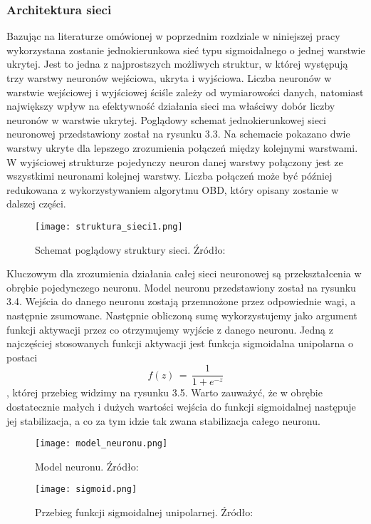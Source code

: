 \subsubsection{Architektura sieci}
Bazując na literaturze omówionej w poprzednim rozdziale w niniejszej pracy wykorzystana zostanie jednokierunkowa sieć typu sigmoidalnego o jednej warstwie ukrytej. Jest to jedna z najprostszych możliwych struktur, w której występują trzy warstwy neuronów wejściowa, ukryta i wyjściowa. Liczba neuronów w warstwie wejściowej i wyjściowej ściśle zależy od wymiarowości danych, natomiast największy wpływ na efektywność działania sieci ma właściwy dobór liczby neuronów w warstwie ukrytej. Poglądowy schemat jednokierunkowej sieci neuronowej przedstawiony został na rysunku 3.3. Na schemacie pokazano dwie warstwy ukryte dla lepszego zrozumienia połączeń między kolejnymi warstwami. W wyjściowej strukturze pojedynczy neuron danej warstwy połączony jest ze wszystkimi neuronami kolejnej warstwy. Liczba połączeń może być później redukowana z wykorzystywaniem algorytmu OBD, który opisany zostanie w dalszej części. 
\begin{figure}[!h]
    \label{fig:struktura-sieci}
    \centering \texttt{[image: struktura\_sieci1.png]}
    \caption{Schemat poglądowy struktury sieci. Źródło: }
\end{figure}

\par Kluczowym dla zrozumienia działania całej sieci neuronowej są przekształcenia w obrębie pojedynczego neuronu. Model neuronu przedstawiony został na rysunku 3.4. Wejścia do danego neuronu zostają przemnożone przez odpowiednie wagi, a następnie zsumowane. Następnie obliczoną sumę wykorzystujemy jako argument funkcji aktywacji przez co otrzymujemy wyjście z danego neuronu. Jedną z najczęściej stosowanych funkcji aktywacji jest funkcja sigmoidalna unipolarna o postaci 
\begin{equation}
f(z) \, = \, \frac{1}{1+e^{-z}} 
\end{equation}
, której przebieg widzimy na rysunku 3.5. Warto zauważyć, że w obrębie dostatecznie małych i dużych wartości wejścia do funkcji sigmoidalnej następuje jej stabilizacja, a co za tym idzie tak zwana stabilizacja całego neuronu.
\begin{figure}[!h]
    \label{fig:struktura-sieci}
    \centering \texttt{[image: model\_neuronu.png]}
    \caption{Model neuronu. Źródło: }
\end{figure}
\begin{figure}[!h]
    \label{fig:sigmoid}
    \centering \texttt{[image: sigmoid.png]}
    \caption{Przebieg funkcji sigmoidalnej unipolarnej. Źródło: }
\end{figure}
